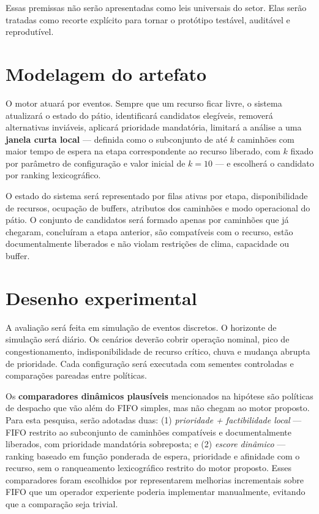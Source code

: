 \documentclass[
  12pt,
  oneside,
  a4paper,
  sumario=tradicional,
  brazil
]{abntex2}
\begin{document}
Essas premissas n\~ao ser\~ao apresentadas como leis universais do setor. Elas ser\~ao tratadas como recorte expl\'icito para tornar o prot\'otipo test\'avel, audit\'avel e reprodut\'ivel.

\section{Modelagem do artefato}
O motor atuar\'a por eventos. Sempre que um recurso ficar livre, o sistema atualizar\'a o estado do p\'atio, identificar\'a candidatos eleg\'iveis, remover\'a alternativas invi\'aveis, aplicar\'a prioridade mandat\'oria, limitar\'a a an\'alise a uma \textbf{janela curta local} --- definida como o subconjunto de at\'e $k$ caminh\~oes com maior tempo de espera na etapa correspondente ao recurso liberado, com $k$ fixado por par\^ametro de configura\c{c}\~ao e valor inicial de $k = 10$ --- e escolher\'a o candidato por ranking lexicogr\'afico.

O estado do sistema ser\'a representado por filas ativas por etapa, disponibilidade de recursos, ocupa\c{c}\~ao de buffers, atributos dos caminh\~oes e modo operacional do p\'atio. O conjunto de candidatos ser\'a formado apenas por caminh\~oes que j\'a chegaram, conclu\'iram a etapa anterior, s\~ao compat\'iveis com o recurso, est\~ao documentalmente liberados e n\~ao violam restri\c{c}\~oes de clima, capacidade ou buffer.

\section{Desenho experimental}
A avalia\c{c}\~ao ser\'a feita em simula\c{c}\~ao de eventos discretos. O horizonte de simula\c{c}\~ao ser\'a di\'ario. Os cen\'arios dever\~ao cobrir opera\c{c}\~ao nominal, pico de congestionamento, indisponibilidade de recurso cr\'itico, chuva e mudan\c{c}a abrupta de prioridade. Cada configura\c{c}\~ao ser\'a executada com sementes controladas e compara\c{c}\~oes pareadas entre pol\'iticas.

Os \textbf{comparadores din\^amicos plaus\'iveis} mencionados na hip\'otese s\~ao pol\'iticas de despacho que v\~ao al\'em do FIFO simples, mas n\~ao chegam ao motor proposto. Para esta pesquisa, ser\~ao adotadas duas: (1) \textit{prioridade + factibilidade local} --- FIFO restrito ao subconjunto de caminh\~oes compat\'iveis e documentalmente liberados, com prioridade mandat\'oria sobreposta; e (2) \textit{escore din\^amico} --- ranking baseado em fun\c{c}\~ao ponderada de espera, prioridade e afinidade com o recurso, sem o ranqueamento lexicogr\'afico restrito do motor proposto. Esses comparadores foram escolhidos por representarem melhorias incrementais sobre FIFO que um operador experiente poderia implementar manualmente, evitando que a compara\c{c}\~ao seja trivial.
\end{document}
